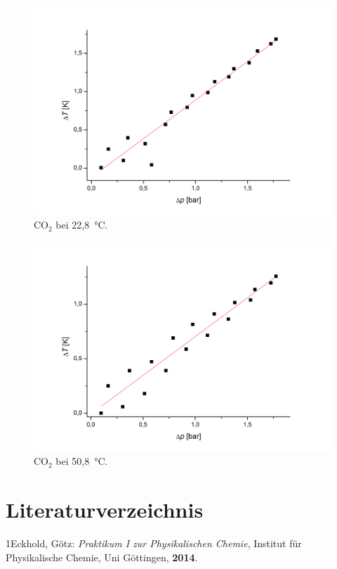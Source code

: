 \documentclass[a4paper,12pt,oneside,onecolum,final,openany]{report}
\begin{document}
\begin{center}
\begin{figure}[h]
\includegraphics[width=13.5cm]{CO2bei20.png}
\caption{$\mathrm{CO}_2$ bei 22,8~°C.}
\end{figure}
\end{center}
\begin{center}
\begin{figure}[h]
\includegraphics[width=13.5cm]{CO2bei50,8.png}
\caption{$\mathrm{CO}_2$ bei 50,8~°C.}
\end{figure}
\end{center}
\newpage




\chapter{Literaturverzeichnis}
1\quad Eckhold, Götz: \emph{Praktikum I zur Physikalischen Chemie}, Institut für Physikalische Chemie, Uni Göttingen, \textbf{2014}.
\end{document}
